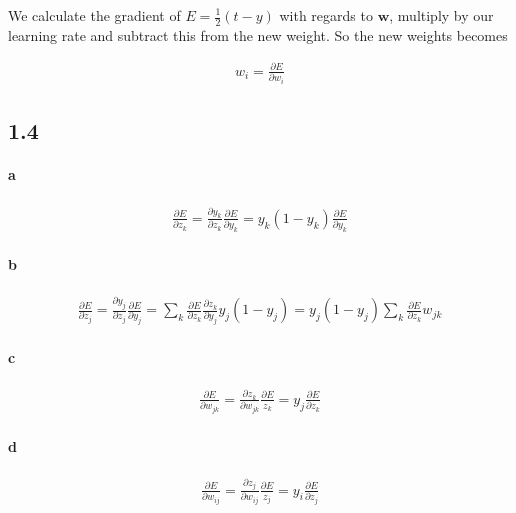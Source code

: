 \documentclass{article}
\begin{document}
We calculate the gradient of $E = \frac{1}{2} \left(t - y \right)$ with regards
to $\mathbf{w}$, multiply by our learning rate and subtract this from the new
weight. So the new weights becomes

\begin{align}
  w_i = \frac{\partial E}{\partial w_i}
\end{align}

\subsection*{1.4}

\paragraph{a}

\begin{align}
  \frac{\partial E}{\partial z_k} = \frac{\partial y_k}{\partial z_k} \frac{\partial E}{\partial y_k} =
  y_k \left( 1 - y_k \right) \frac{\partial E}{\partial y_k}
\end{align}

\paragraph{b}

\begin{align}
  \frac{\partial E}{\partial z_j} = \frac{\partial y_j}{\partial z_j} \frac{\partial E}{\partial y_j} =
  \sum_k \frac{\partial E}{\partial z_k}\frac{\partial z_k}{\partial y_j} y_j \left( 1 - y_j \right) =
   y_j \left( 1 - y_j \right) \sum_k \frac{\partial E}{\partial z_k}w_{jk}
\end{align}

\paragraph{c}

\begin{align}
  \frac{\partial E}{\partial w_{jk}} = \frac{\partial z_k}{\partial w_{jk}} \frac{\partial E}{z_k} =
  y_j \frac{\partial E}{\partial z_k}
\end{align}

\paragraph{d}

\begin{align}
  \frac{\partial E}{\partial w_{ij}} = \frac{\partial z_j}{\partial w_{ij}} \frac{\partial E}{z_j} =
  y_i \frac{\partial E}{\partial z_j}
\end{align}
\end{document}
